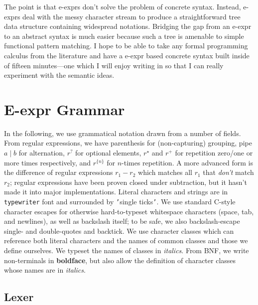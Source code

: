 \documentclass[11pt]{article} %
\begin{document}
The point is that e-exprs don't solve the problem of concrete syntax.
Instead, e-exprs deal with the messy character stream to produce a straightforward tree data structure containing widespread notations.
Bridging the gap from an e-expr to an abstract syntax is much easier because such a tree is amenable to simple functional pattern matching.
I hope to be able to take any formal programming calculus from the literature and have a e-expr based concrete syntax built inside of fifteen minutes---one which I will enjoy writing in so that I can really experiment with the semantic ideas.

\section{E-expr Grammar}

In the following, we use grammatical notation drawn from a number of fields.
From regular expressions, we have
  parenthesis for (non-capturing) grouping,
  pipe $a \mid b$ for alternation,
  $r^?$ for optional elements,
  $r^\star$ and $r^+$ for repetition zero/one or more times respectively,
  and $r^{\{n\}}$ for $n$-times repetition.
A more advanced form is the difference of regular expressions $r_1 - r_2$ which matches all $r_1$ that \emph{don't} match $r_2$; regular expressions have been proven closed under subtraction, but it hasn't made it into major implementations.
Literal characters and strings are in \texttt{typewriter} font and surrounded by \texttt{'}single ticks\texttt{'}.
We use standard C-style character escapes for otherwise hard-to-typeset whitespace characters (space, tab, and newlines), as well as backslash itself; to be safe, we also backslash-escape single- and double-quotes and backtick.
We use character classes which can reference both literal characters and the names of common classes and those we define ourselves.
  We typeset the names of classes in \textit{italics}.
From BNF, we write 
  non-terminals in \textbf{boldface},
  but also allow the definition of character classes whose names are in \textit{italics}.

\subsection{Lexer}

\newcommand*\literal[1]{\texttt{'{#1}'}}
\newcommand*\notcharclass[1]{\mathopen{\lnot[\mathord:\;} #1 \mathclose{\;\mathord:]}}
\newcommand*\charclass[1]{\mathopen{[\mathord:\;} #1 \mathclose{\;\mathord:]}}
\end{document}
